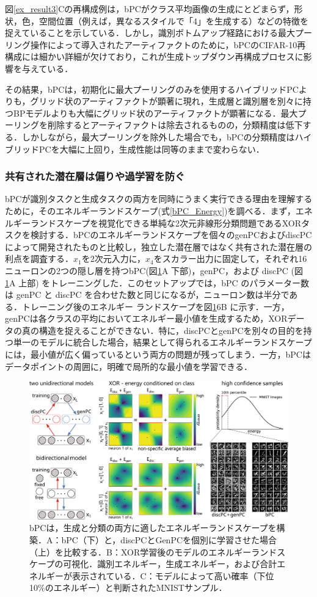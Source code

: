 \documentclass[a4paper, titlepage]{jsarticle}
\begin{document}
図\ref{ex_result3}Cの再構成例は，bPCがクラス平均画像の生成にとどまらず，形状，色，空間位置（例えば，異なるスタイルで「4」を生成する）などの特徴を捉えていることを示している．しかし，識別ボトムアップ経路における最大プーリング操作によって導入されたアーティファクトのために，bPCのCIFAR-10再構成には細かい詳細が欠けており，これが生成トップダウン再構成プロセスに影響を与えている．
\par
その結果，bPCは，初期化に最大プーリングのみを使用するハイブリッドPCよりも，グリッド状のアーティファクトが顕著に現れ，生成層と識別層を別々に持つBPモデルよりも大幅にグリッド状のアーティファクトが顕著になる．最大プーリングを削除するとアーティファクトは除去されるものの，分類精度は低下する．しかしながら，最大プーリングを除外した場合でも，bPCの分類精度はハイブリッドPCを大幅に上回り，生成性能は同等のままで変わらない．
\subsubsection{共有された潜在層は偏りや過学習を防ぐ}
bPCが識別タスクと生成タスクの両方を同時にうまく実行できる理由を理解するために，そのエネルギーランドスケープ(式\eqref{bPC_Energy})を調べる．まず，エネルギーランドスケープを視覚化できる単純な2次元非線形分類問題であるXORタスクを検討する．bPCのエネルギーランドスケープを個々のgenPCおよびdiscPCによって開発されたものと比較し，独立した潜在層ではなく共有された潜在層の利点を調査する．$x_1$を2次元入力に，$x_4$をスカラー出力に固定して，それぞれ16ニューロンの2つの隠し層を持つbPC(図\ref{ex_result4}A 下部)，genPC，および discPC (図\ref{ex_result4}A 上部) をトレーニングした．このセットアップでは，bPC のパラメーター数は genPC と discPC を合わせた数と同じになるが，ニューロン数は半分である．トレーニング後のエネルギー ランドスケープを図\ref{ex_result4}6B に示す．一方，genPCは各クラスの平均においてエネルギー最小値を生成するため，XORデータの真の構造を捉えることができない．特に，discPCとgenPCを別々の目的を持つ単一のモデルに統合した場合，結果として得られるエネルギーランドスケープには，最小値が広く偏っているという両方の問題が残ってしまう．一方，bPCはデータポイントの周囲に，明確で局所的な最小値を学習できる．
\begin{figure}[htbp]
   \centering
   \includegraphics[scale=0.26]{x6.png}
   \caption{bPCは，生成と分類の両方に適したエネルギーランドスケープを構築．A：bPC（下）と，discPCとGenPCを個別に学習させた場合（上）を比較する．B：XOR学習後のモデルのエネルギーランドスケープの可視化．識別エネルギー，生成エネルギー，および合計エネルギーが表示されている．C：モデルによって高い確率（下位10\%のエネルギー）と判断されたMNISTサンプル．}
   \label{ex_result4}
\end{figure}
\end{document}
